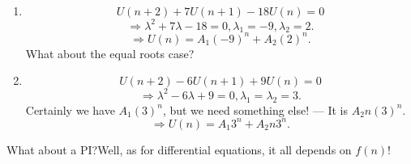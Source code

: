 \documentclass[12pt]{report}
\theoremstyle{definition}
\begin{document}
\begin{ex}
    \;

    \begin{enumerate}[label = (\arabic*)]
        \item \[
                U(n + 2) + 7U(n + 1) - 18U(n) = 0
        \]\[
            \Rightarrow{} \lambda^{2} + 7\lambda - 18 = 0, \lambda_1 = -9, \lambda_2 = 2.
        \]\[
        \Rightarrow{} U(n) = A_1 {(-9)}^{n} + A_2 {(2)}^{n}.
        \]
        What about the equal roots case?

    \item \[
            U(n + 2) - 6U(n + 1) + 9U(n) = 0
    \]\[
        \Rightarrow{} \lambda^{2} - 6\lambda + 9 = 0, \lambda_1 = \lambda_2 = 3.
    \]Certainly we have $A_1{(3)}^{n}$, but we need something else!
    --- It is $A_2 n {(3)}^{n}$.\[
        \Rightarrow{} U(n) = A_1 3^{n} + A_2 n 3^{n}.
    \]
    \end{enumerate}
\end{ex}
\noindent What about a PI?\@ Well, as for differential equations, it all depends on $f(n)$!
\end{document}
